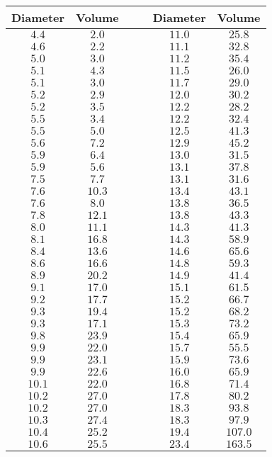 \begin{tabular}{ccrrcc} \toprule
Diameter & Volume &&& Diameter & Volume  \\\midrule
$4.4$    & $2.0$  &&& $11.0$   & $25.8$  \\
$4.6$    & $2.2$  &&& $11.1$   & $32.8$  \\
$5.0$    & $3.0$  &&& $11.2$   & $35.4$  \\
$5.1$    & $4.3$  &&& $11.5$   & $26.0$  \\
$5.1$    & $3.0$  &&& $11.7$   & $29.0$  \\
$5.2$    & $2.9$  &&& $12.0$   & $30.2$  \\
$5.2$    & $3.5$  &&& $12.2$   & $28.2$  \\
$5.5$    & $3.4$  &&& $12.2$   & $32.4$  \\
$5.5$    & $5.0$  &&& $12.5$   & $41.3$  \\
$5.6$    & $7.2$  &&& $12.9$   & $45.2$  \\
$5.9$    & $6.4$  &&& $13.0$   & $31.5$  \\
$5.9$    & $5.6$  &&& $13.1$   & $37.8$  \\
$7.5$    & $7.7$  &&& $13.1$   & $31.6$  \\
$7.6$    & $10.3$ &&& $13.4$   & $43.1$  \\
$7.6$    & $8.0$  &&& $13.8$   & $36.5$  \\
$7.8$    & $12.1$ &&& $13.8$   & $43.3$  \\
$8.0$    & $11.1$ &&& $14.3$   & $41.3$  \\
$8.1$    & $16.8$ &&& $14.3$   & $58.9$  \\
$8.4$    & $13.6$ &&& $14.6$   & $65.6$  \\
$8.6$    & $16.6$ &&& $14.8$   & $59.3$  \\
$8.9$    & $20.2$ &&& $14.9$   & $41.4$  \\
$9.1$    & $17.0$ &&& $15.1$   & $61.5$  \\
$9.2$    & $17.7$ &&& $15.2$   & $66.7$  \\
$9.3$    & $19.4$ &&& $15.2$   & $68.2$  \\
$9.3$    & $17.1$ &&& $15.3$   & $73.2$  \\
$9.8$    & $23.9$ &&& $15.4$   & $65.9$  \\
$9.9$    & $22.0$ &&& $15.7$   & $55.5$  \\
$9.9$    & $23.1$ &&& $15.9$   & $73.6$  \\
$9.9$    & $22.6$ &&& $16.0$   & $65.9$  \\
$10.1$   & $22.0$ &&& $16.8$   & $71.4$  \\
$10.2$   & $27.0$ &&& $17.8$   & $80.2$  \\
$10.2$   & $27.0$ &&& $18.3$   & $93.8$  \\
$10.3$   & $27.4$ &&& $18.3$   & $97.9$  \\
$10.4$   & $25.2$ &&& $19.4$   & $107.0$ \\
$10.6$   & $25.5$ &&& $23.4$   & $163.5$ \\\bottomrule
\end{tabular}
